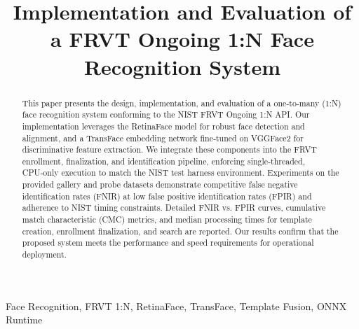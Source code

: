 \documentclass[conference]{IEEEtran}
\begin{document}
\title{Implementation and Evaluation of a FRVT Ongoing 1:N Face Recognition System}



\author{
\and
{}
}

\maketitle

\begin{abstract}
This paper presents the design, implementation, and evaluation of a one‑to‑many (1:N) face recognition system conforming to the NIST FRVT Ongoing 1:N API. Our implementation leverages the RetinaFace model for robust face detection and alignment, and a TransFace embedding network fine‑tuned on VGGFace2 for discriminative feature extraction. We integrate these components into the FRVT enrollment, finalization, and identification pipeline, enforcing single‑threaded, CPU‑only execution to match the NIST test harness environment. Experiments on the provided gallery and probe datasets demonstrate competitive false negative identification rates (FNIR) at low false positive identification rates (FPIR) and adherence to NIST timing constraints. Detailed FNIR vs. FPIR curves, cumulative match characteristic (CMC) metrics, and median processing times for template creation, enrollment finalization, and search are reported. Our results confirm that the proposed system meets the performance and speed requirements for operational deployment. 
\end{abstract}

\begin{IEEEkeywords}
Face Recognition, FRVT 1:N, RetinaFace, TransFace, Template Fusion, ONNX Runtime
\end{IEEEkeywords}
\end{document}
